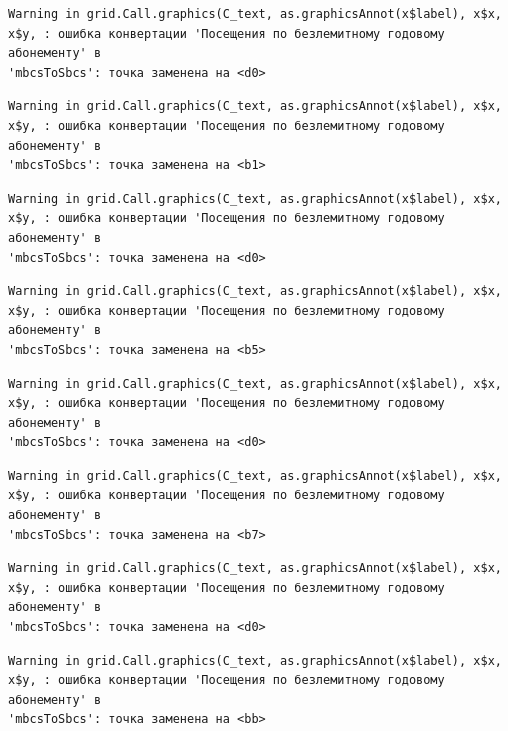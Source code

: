 \documentclass[
  letterpaper,
  DIV=11,
  numbers=noendperiod]{scrreprt}
\begin{document}
\begin{verbatim}
Warning in grid.Call.graphics(C_text, as.graphicsAnnot(x$label), x$x,
x$y, : ошибка конвертации 'Посещения по безлемитному годовому абонементу' в
'mbcsToSbcs': точка заменена на <d0>
\end{verbatim}

\begin{verbatim}
Warning in grid.Call.graphics(C_text, as.graphicsAnnot(x$label), x$x,
x$y, : ошибка конвертации 'Посещения по безлемитному годовому абонементу' в
'mbcsToSbcs': точка заменена на <b1>
\end{verbatim}

\begin{verbatim}
Warning in grid.Call.graphics(C_text, as.graphicsAnnot(x$label), x$x,
x$y, : ошибка конвертации 'Посещения по безлемитному годовому абонементу' в
'mbcsToSbcs': точка заменена на <d0>
\end{verbatim}

\begin{verbatim}
Warning in grid.Call.graphics(C_text, as.graphicsAnnot(x$label), x$x,
x$y, : ошибка конвертации 'Посещения по безлемитному годовому абонементу' в
'mbcsToSbcs': точка заменена на <b5>
\end{verbatim}

\begin{verbatim}
Warning in grid.Call.graphics(C_text, as.graphicsAnnot(x$label), x$x,
x$y, : ошибка конвертации 'Посещения по безлемитному годовому абонементу' в
'mbcsToSbcs': точка заменена на <d0>
\end{verbatim}

\begin{verbatim}
Warning in grid.Call.graphics(C_text, as.graphicsAnnot(x$label), x$x,
x$y, : ошибка конвертации 'Посещения по безлемитному годовому абонементу' в
'mbcsToSbcs': точка заменена на <b7>
\end{verbatim}

\begin{verbatim}
Warning in grid.Call.graphics(C_text, as.graphicsAnnot(x$label), x$x,
x$y, : ошибка конвертации 'Посещения по безлемитному годовому абонементу' в
'mbcsToSbcs': точка заменена на <d0>
\end{verbatim}

\begin{verbatim}
Warning in grid.Call.graphics(C_text, as.graphicsAnnot(x$label), x$x,
x$y, : ошибка конвертации 'Посещения по безлемитному годовому абонементу' в
'mbcsToSbcs': точка заменена на <bb>
\end{verbatim}
\end{document}
